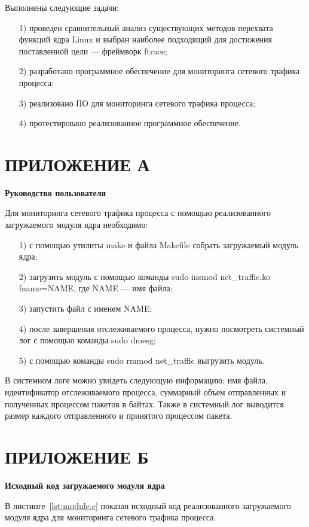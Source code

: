 \documentclass{bmstu}
\begin{document}
Выполнены следующие задачи:
\begin{enumerate}
\item[1)] проведен сравнительный анализ существующих методов перехвата функций ядра Linux и выбран наиболее подходящий для достижения поставленной цели --- фреймворк ftrace;
\item[2)] разработано программное обеспечение для мониторинга сетевого трафика процесса;
\item[3)] реализовано ПО для мониторинга сетевого трафика процесса;
\item[4)] протестировано реализованное программное обеспечение.
\end{enumerate}

{\centering \printbibliography[title=СПИСОК ИСПОЛЬЗОВАННЫХ ИСТОЧНИКОВ,heading=bibintoc]}

{\centering \chapter*{ПРИЛОЖЕНИЕ А}}
\begin{center}
\textbf{Руководство пользователя}
\end{center}

Для мониторинга сетевого трафика процесса с помощью реализованного загружаемого модуля ядра необходимо:
\begin{enumerate}
\item[1)] с помощью утилиты make и файла Makefile собрать загружаемый модуль ядра;
\item[2)] загрузить модуль с помощью команды sudo insmod net\_traffic.ko fname=NAME, где NAME --- имя файла;
\item[3)] запустить файл с именем NAME;
\item[4)] после завершения отслеживаемого процесса, нужно посмотреть системный лог с помощью команды sudo dmesg;
\item[5)] с помощью команды sudo rmmod net\_traffic выгрузить модуль.
\end{enumerate}

В системном логе можно увидеть следующую информацию: имя файла, идентификатор отслеживаемого процесса, суммарный объем отправленных и полученных процессом пакетов в байтах. 
Также в системный лог выводится размер каждого отправленного и принятого процессом пакета.

{\centering \chapter*{ПРИЛОЖЕНИЕ Б}}
\begin{center}
\textbf{Исходный код загружаемого модуля ядра}
\end{center}

В листинге~\ref{lst:module.c} показан исходный код реализованного загружаемого модуля ядра для мониторинга сетевого трафика процесса.

\end{document}
